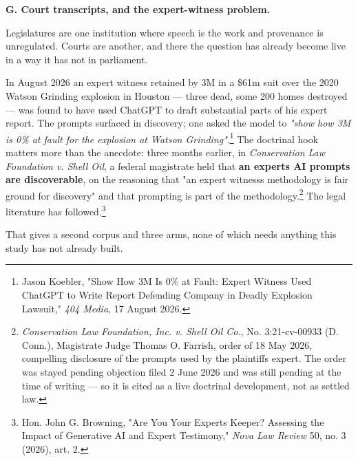 \textbf{G. Court transcripts, and the expert-witness problem.}

Legislatures are one institution where speech is the work and provenance is
unregulated. Courts are another, and there the question has already become
live in a way it has not in parliament.

In August 2026 an expert witness retained by 3M in a \$61m suit over the 2020
Watson Grinding explosion in Houston --- three dead, some 200 homes destroyed ---
was found to have used ChatGPT to draft substantial parts of his expert report.
The prompts surfaced in discovery; one asked the model to \emph{"show how 3M is 0\%
at fault for the explosion at Watson Grinding"}.\footnote{Jason Koebler, "\textquotesingle Show How 3M Is 0\% at Fault\textquotesingle: Expert Witness Used
  ChatGPT to Write Report Defending Company in Deadly Explosion Lawsuit,"
  \emph{404 Media}, 17 August 2026.} The doctrinal hook
matters more than the anecdote: three months earlier, in \emph{Conservation Law
Foundation v. Shell Oil}, a federal magistrate held that \textbf{an expert\textquotesingle s AI
prompts are discoverable}, on the reasoning that "an expert witness\textquotesingle s
methodology is fair ground for discovery" and that prompting is part of the
methodology.\footnote{\emph{Conservation Law Foundation, Inc. v. Shell Oil Co.}, No. 3:21-cv-00933
  (D. Conn.), Magistrate Judge Thomas O. Farrish, order of 18 May 2026,
  compelling disclosure of the prompts used by the plaintiff\textquotesingle s expert. The
  order was stayed pending objection filed 2 June 2026 and was still pending
  at the time of writing --- so it is cited as a live doctrinal development, not
  as settled law.} The legal literature has followed.\footnote{Hon. John G. Browning, "Are You Your Expert\textquotesingle s Keeper? Assessing the
  Impact of Generative AI and Expert Testimony," \emph{Nova Law Review} 50, no. 3
  (2026), art. 2.}

That gives a second corpus and three arms, none of which needs anything this
study has not already built.

